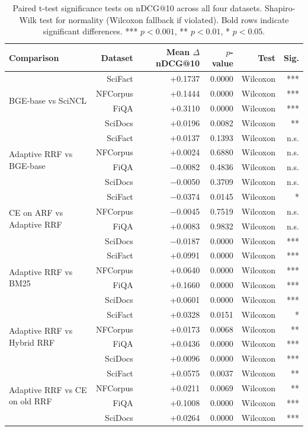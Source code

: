 \begin{table}[htbp]
\centering
\caption{Paired t-test significance tests on nDCG@10 across all four datasets. Shapiro-Wilk test for normality (Wilcoxon fallback if violated). Bold rows indicate significant differences. *** $p<0.001$, ** $p<0.01$, * $p<0.05$.}
\label{tab:significance}
\setlength{\tabcolsep}{3.5pt}
\small
\begin{tabular}{lrrrrr}
\toprule
Comparison & Dataset & Mean $\Delta$ nDCG@10 & $p$-value & Test & Sig. \\
\midrule
\multirow{4}{*}{BGE-base vs SciNCL}
    & SciFact  & +0.1737 & 0.0000 & Wilcoxon & *** \\
    & NFCorpus & +0.1444 & 0.0000 & Wilcoxon & *** \\
    & FiQA     & +0.3110 & 0.0000 & Wilcoxon & *** \\
    & SciDocs  & +0.0196 & 0.0082 & Wilcoxon & ** \\
\midrule
\multirow{4}{*}{Adaptive RRF vs BGE-base}
    & SciFact  & +0.0137 & 0.1393 & Wilcoxon & n.s. \\
    & NFCorpus & +0.0024 & 0.6880 & Wilcoxon & n.s. \\
    & FiQA     & $-$0.0082 & 0.4836 & Wilcoxon & n.s. \\
    & SciDocs  & $-$0.0050 & 0.3709 & Wilcoxon & n.s. \\
\midrule
\multirow{4}{*}{CE on ARF vs Adaptive RRF}
    & SciFact  & $-$0.0374 & 0.0145 & Wilcoxon & * \\
    & NFCorpus & $-$0.0045 & 0.7519 & Wilcoxon & n.s. \\
    & FiQA     & +0.0083 & 0.9832 & Wilcoxon & n.s. \\
    & SciDocs  & $-$0.0187 & 0.0000 & Wilcoxon & *** \\
\midrule
\multirow{4}{*}{Adaptive RRF vs BM25}
    & SciFact  & +0.0991 & 0.0000 & Wilcoxon & *** \\
    & NFCorpus & +0.0640 & 0.0000 & Wilcoxon & *** \\
    & FiQA     & +0.1660 & 0.0000 & Wilcoxon & *** \\
    & SciDocs  & +0.0601 & 0.0000 & Wilcoxon & *** \\
\midrule
\multirow{4}{*}{Adaptive RRF vs Hybrid RRF}
    & SciFact  & +0.0328 & 0.0151 & Wilcoxon & * \\
    & NFCorpus & +0.0173 & 0.0068 & Wilcoxon & ** \\
    & FiQA     & +0.0436 & 0.0000 & Wilcoxon & *** \\
    & SciDocs  & +0.0096 & 0.0000 & Wilcoxon & *** \\
\midrule
\multirow{4}{*}{Adaptive RRF vs CE on old RRF}
    & SciFact  & +0.0575 & 0.0037 & Wilcoxon & ** \\
    & NFCorpus & +0.0211 & 0.0069 & Wilcoxon & ** \\
    & FiQA     & +0.1008 & 0.0000 & Wilcoxon & *** \\
    & SciDocs  & +0.0264 & 0.0000 & Wilcoxon & *** \\
\bottomrule
\end{tabular}
\end{table}
